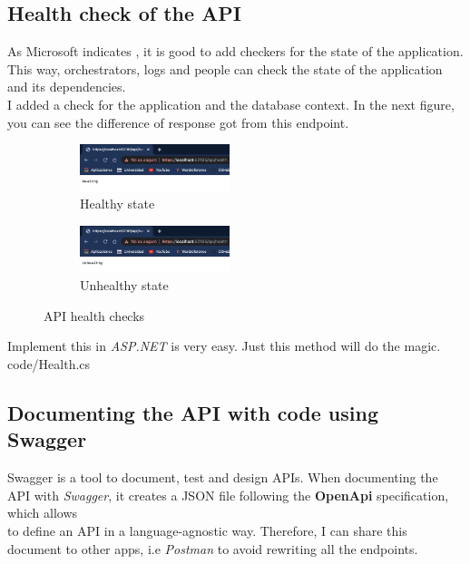     \subsection{Health check of the API}
    As Microsoft indicates \cite{Health}, it is good to add checkers for the state of the application. This way, orchestrators, logs and people can check the state of the application and its dependencies. \\
    I added a check for the application and the database context. In the next figure, you can see the difference of response got from this endpoint. \\
    
    \begin{figure}[H]
        \centering
        \begin{subfigure}[T]{0.49\textwidth}
            \centering
            \includegraphics[width=0.48\textwidth]{assets/healthy.png}
            \caption{Healthy state}
            \label{fig:impl_healthy}
        \end{subfigure}
        \hfill
        \begin{subfigure}[T]{0.49\textwidth}
            \centering
            \includegraphics[width=0.48\textwidth]{assets/unhealthy.png}
            \caption{Unhealthy state}
            \label{fig:impl_unhealthy}
        \end{subfigure}
           \caption{API health checks}
           \label{fig:impl_health}
    \end{figure}

    Implement this in \textit{ASP.NET} is very easy. Just this method will do the magic. \\
    
    {code/Health.cs}

    \subsection{Documenting the API with code using Swagger}
    Swagger \cite{Swagger} is a tool to document, test and design APIs. When documenting the API with \textit{Swagger}, it creates a JSON file following the \textbf{OpenApi} specification, which allows \\
    to define an API in a language-agnostic way. Therefore, I can share this document to other apps, i.e \textit{Postman} to avoid rewriting all the endpoints.

